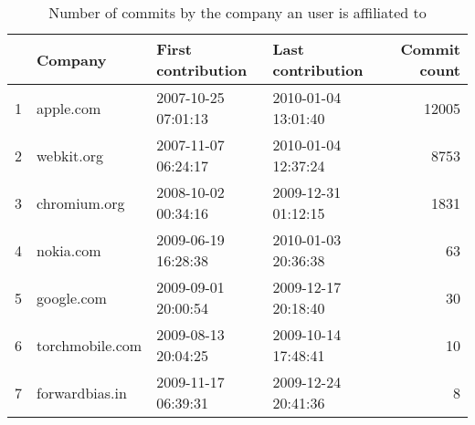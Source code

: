 \begin{table}[!htpb]
\begin{center}
\begin{tabular}{rlllr}
  \hline
 & Company & First contribution & Last contribution & Commit count \\ 
  \hline
1 & apple.com & 2007-10-25 07:01:13 & 2010-01-04 13:01:40 & 12005 \\ 
  2 & webkit.org & 2007-11-07 06:24:17 & 2010-01-04 12:37:24 & 8753 \\ 
  3 & chromium.org & 2008-10-02 00:34:16 & 2009-12-31 01:12:15 & 1831 \\ 
  4 & nokia.com & 2009-06-19 16:28:38 & 2010-01-03 20:36:38 &  63 \\ 
  5 & google.com & 2009-09-01 20:00:54 & 2009-12-17 20:18:40 &  30 \\ 
  6 & torchmobile.com & 2009-08-13 20:04:25 & 2009-10-14 17:48:41 &  10 \\ 
  7 & forwardbias.in & 2009-11-17 06:39:31 & 2009-12-24 20:41:36 &   8 \\ 
   \hline
\end{tabular}
\caption{Number of commits by the company an user is affiliated to}
\label{commits:company}
\end{center}
\end{table}
